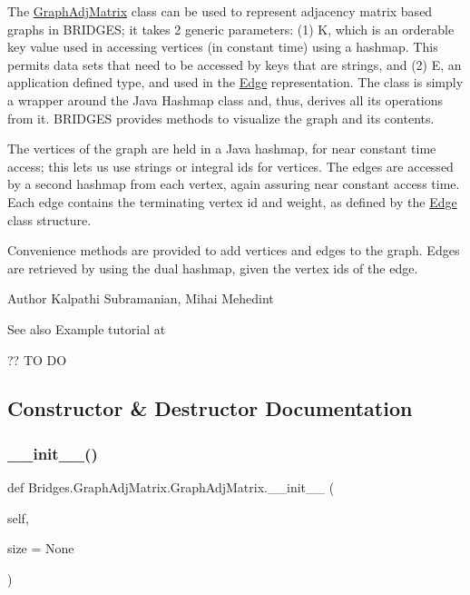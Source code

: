 The \mbox{\hyperlink{class_bridges_1_1_graph_adj_matrix_1_1_graph_adj_matrix}{Graph\+Adj\+Matrix}} class can be used to represent adjacency matrix based graphs in B\+R\+I\+D\+G\+ES; it takes 2 generic parameters\+: (1) K, which is an orderable key value used in accessing vertices (in constant time) using a hashmap. This permits data sets that need to be accessed by keys that are strings, and (2) E, an application defined type, and used in the \mbox{\hyperlink{namespace_bridges_1_1_edge}{Edge}} representation. The class is simply a wrapper around the Java Hashmap class and, thus, derives all its operations from it. B\+R\+I\+D\+G\+ES provides methods to visualize the graph and its contents.

The vertices of the graph are held in a Java hashmap, for near constant time access; this lets us use strings or integral ids for vertices. The edges are accessed by a second hashmap from each vertex, again assuring near constant access time. Each edge contains the terminating vertex id and weight, as defined by the \mbox{\hyperlink{namespace_bridges_1_1_edge}{Edge}} class structure.

Convenience methods are provided to add vertices and edges to the graph. Edges are retrieved by using the dual hashmap, given the vertex ids of the edge.

\begin{DoxyAuthor}{Author}
Kalpathi Subramanian, Mihai Mehedint
\end{DoxyAuthor}
\begin{DoxySeeAlso}{See also}
Example tutorial at 
\end{DoxySeeAlso}
?? TO DO 

\subsection{Constructor \& Destructor Documentation}
\mbox{\label{class_bridges_1_1_graph_adj_matrix_1_1_graph_adj_matrix_adba83cb630fd41002e8bff1c57ec3555}} 
\subsubsection{\texorpdfstring{\+\_\+\+\_\+init\+\_\+\+\_\+()}{\_\_init\_\_()}}
{\footnotesize\ttfamily def Bridges.\+Graph\+Adj\+Matrix.\+Graph\+Adj\+Matrix.\+\_\+\+\_\+init\+\_\+\+\_\+ (\begin{DoxyParamCaption}\item[{}]{self,  }\item[{}]{size = {\ttfamily None} }\end{DoxyParamCaption})}



